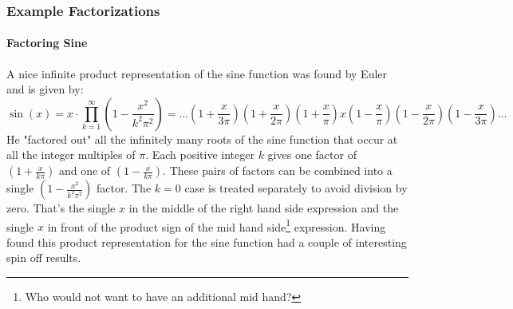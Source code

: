 
%


\subsubsection{Example Factorizations}

\paragraph{Factoring Sine}
A nice infinite product representation of the sine function was found by Euler and is given by:
\begin{equation}
\label{Eq:SineInfProduct}
\sin(x) = x \cdot \prod_{k=1}^{\infty} \left( 1 - \frac{x^2}{k^2 \pi^2}  \right)
        = \ldots \left(1 + \frac{x}{3 \pi}  \right)
                 \left(1 + \frac{x}{2 \pi}  \right) 
                 \left(1 + \frac{x}{  \pi}  \right)
                 x 
                 \left(1 - \frac{x}{  \pi}  \right)
                 \left(1 - \frac{x}{2 \pi}  \right) 
                 \left(1 - \frac{x}{3 \pi}  \right)
          \ldots
\end{equation}
He "factored out" all the infinitely many roots of the sine function that occur at all the integer multiples of $\pi$. Each positive integer $k$ gives one factor of $(1 + \frac{x}{k \pi})$ and one of $(1 - \frac{x}{k \pi})$. These pairs of factors can be combined into a single $(1 - \frac{x^2}{k^2 \pi^2})$ factor. The $k=0$ case is treated separately to avoid division by zero. That's the single $x$ in the middle of the right hand side expression and the single $x$ in front of the product sign of the mid hand side\footnote{Who would not want to have an additional mid hand?} expression. Having found this product representation for the sine function had a couple of interesting spin off results.

